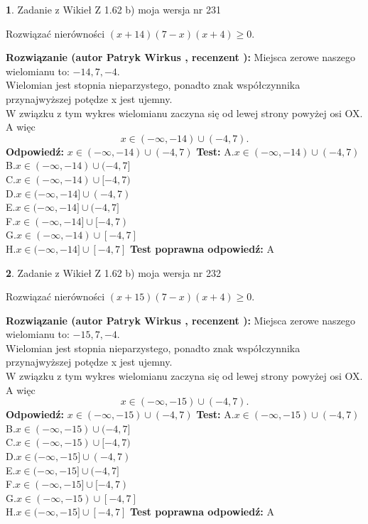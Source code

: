 \documentclass[12pt, a4paper]{article}
\theoremstyle{definition} %
\newtheorem{zad}{}
\newcommand{\zadStart}[1]{\begin{zad}#1\newline}
\newcommand{\zadStop}{\end{zad}}
\newcommand{\rozwStart}[2]{\noindent \textbf{Rozwiązanie (autor #1 , recenzent #2): }\newline}
\newcommand{\rozwStop}{\newline}
\newcommand{\odpStart}{\noindent \textbf{Odpowiedź:}\newline}
\newcommand{\odpStop}{\newline}
\newcommand{\testStart}{\noindent \textbf{Test:}\newline}
\newcommand{\testStop}{\newline}
\newcommand{\kluczStart}{\noindent \textbf{Test poprawna odpowiedź:}\newline}
\newcommand{\kluczStop}{\newline}
\begin{document}
\zadStart{Zadanie z Wikieł Z 1.62 b) moja wersja nr 231}

Rozwiązać nierówności $(x+14)(7-x)(x+4)\ge0$.
\zadStop
\rozwStart{Patryk Wirkus}{}
Miejsca zerowe naszego wielomianu to: $-14, 7, -4$.\\
Wielomian jest stopnia nieparzystego, ponadto znak współczynnika przy\linebreak najwyższej potędze x jest ujemny.\\ W związku z tym wykres wielomianu zaczyna się od lewej strony powyżej osi OX. A więc $$x \in (-\infty,-14) \cup (-4,7).$$
\rozwStop
\odpStart
$x \in (-\infty,-14) \cup (-4,7)$
\odpStop
\testStart
A.$x \in (-\infty,-14) \cup (-4,7)$\\
B.$x \in (-\infty,-14) \cup (-4,7]$\\
C.$x \in (-\infty,-14) \cup [-4,7)$\\
D.$x \in (-\infty,-14] \cup (-4,7)$\\
E.$x \in (-\infty,-14] \cup (-4,7]$\\
F.$x \in (-\infty,-14] \cup [-4,7)$\\
G.$x \in (-\infty,-14) \cup [-4,7]$\\
H.$x \in (-\infty,-14] \cup [-4,7]$
\testStop
\kluczStart
A
\kluczStop



\zadStart{Zadanie z Wikieł Z 1.62 b) moja wersja nr 232}

Rozwiązać nierówności $(x+15)(7-x)(x+4)\ge0$.
\zadStop
\rozwStart{Patryk Wirkus}{}
Miejsca zerowe naszego wielomianu to: $-15, 7, -4$.\\
Wielomian jest stopnia nieparzystego, ponadto znak współczynnika przy\linebreak najwyższej potędze x jest ujemny.\\ W związku z tym wykres wielomianu zaczyna się od lewej strony powyżej osi OX. A więc $$x \in (-\infty,-15) \cup (-4,7).$$
\rozwStop
\odpStart
$x \in (-\infty,-15) \cup (-4,7)$
\odpStop
\testStart
A.$x \in (-\infty,-15) \cup (-4,7)$\\
B.$x \in (-\infty,-15) \cup (-4,7]$\\
C.$x \in (-\infty,-15) \cup [-4,7)$\\
D.$x \in (-\infty,-15] \cup (-4,7)$\\
E.$x \in (-\infty,-15] \cup (-4,7]$\\
F.$x \in (-\infty,-15] \cup [-4,7)$\\
G.$x \in (-\infty,-15) \cup [-4,7]$\\
H.$x \in (-\infty,-15] \cup [-4,7]$
\testStop
\kluczStart
A
\kluczStop
\end{document}
